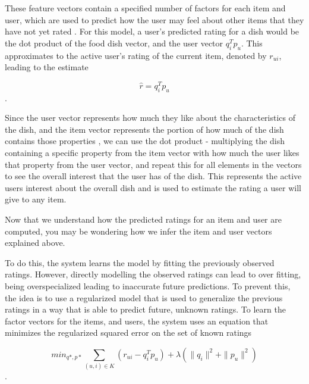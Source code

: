 These feature vectors contain a specified number of factors for each item and user, which are used to predict how the user may feel about other items that they have not yet rated \cite{koren2009matrix}. For this model, a user's predicted rating for a dish would be the dot product of the food dish vector, and the user vector \begin{math} q_{i}^T p_{u} \end{math}. This approximates to the active user's rating of the current item, denoted by \begin{math} r_{ui} \end{math}, leading to the estimate \cite{koren2009matrix}

\begin{equation}\label{eq:1}\tag{1} \widehat{r} = q_{i}^T p_{u} \end{equation}.


Since the user vector represents how much they like about the characteristics of the dish, and the item vector represents the portion of how much of the dish contains those properties \cite{koren2009matrix}, we can use the dot product - multiplying the dish containing a specific property from the item vector with how much the user likes that property from the user vector, and repeat this for all elements in the vectors to see the overall interest that the user has of the dish. This represents the active users interest about the overall dish and is used to estimate the rating a user will give to any item. 

Now that we understand how the predicted ratings for an item and user are computed, you may be wondering how we infer the item and user vectors explained above. 

To do this, the system learns the model by fitting the previously observed ratings. However, directly modelling the observed ratings can lead to over fitting, being overspecialized leading to inaccurate future predictions. To prevent this, the idea is to use a regularized model that is used to generalize the previous ratings in a way that is able to predict future, unknown ratings. To learn the factor vectors for the items, and users, the system uses an equation that minimizes the regularized squared error on the set of known ratings

\begin{equation}\label{eq:2}\tag{2}
\displaystyle min_{q*,p*} \sum_{ (u,i) \in K} (r_{ui} - q_{i}^T p_{u}) + \lambda (\| q_{i} \|^2 + \| p_{u} \|^2 )
\end{equation}.

